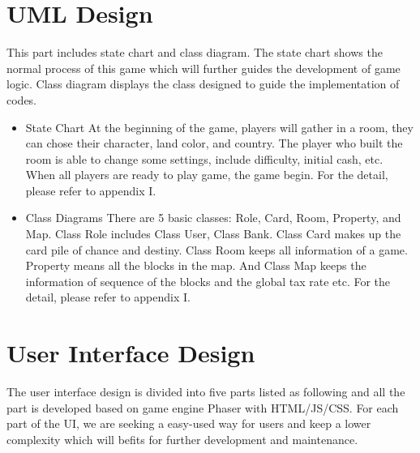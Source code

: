 \documentclass[a4paper,12pt]{article}
\begin{document}
\section{UML Design}
\lettrine[lines=2,loversize=0.35,lraise=0.07,findent=3pt,nindent=2pt]{T}{}his part includes state chart and class diagram. The state chart shows the normal process of this game which will further guides the development of game logic. Class diagram displays the class designed to guide the implementation of codes. 
\begin{itemize}
\item State Chart
At the beginning of the game, players will gather in a room, they can chose their character, land color, and country. The player who built the room is able to change some settings, include difficulty, initial cash, etc. When all players are ready to play game, the game begin. For the detail, please refer to appendix I.
\item Class Diagrams
There are 5 basic classes: Role, Card, Room, Property, and Map. Class Role includes Class User, Class Bank. Class Card makes up the card pile of chance and destiny. Class Room keeps all information of a game. Property means all the blocks in the map. And Class Map keeps the information of sequence of the blocks and the global tax rate etc. For the detail, please refer to appendix I.
\end{itemize}
\section{User Interface Design}
\lettrine[lines=2,loversize=0.35,lraise=0.07,findent=3pt,nindent=2pt]{T}{}he user interface design is divided into five parts listed as following and all the part is developed based on game engine Phaser with HTML/JS/CSS. For each part of the UI, we are seeking a easy-used way for users and keep a lower complexity which will befits for further development and maintenance. 
\end{document}
